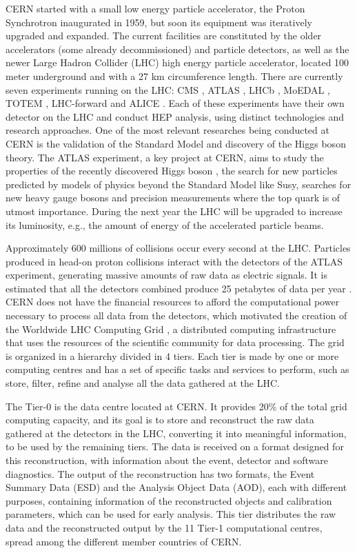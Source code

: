 CERN started with a small low energy particle accelerator, the Proton Synchrotron \cite{CERN:PS} inaugurated in 1959, but soon its equipment was iteratively upgraded and expanded. The current facilities are constituted by the older accelerators (some already decommissioned) and particle detectors, as well as the newer Large Hadron Collider (LHC) \cite{CERN:LHC} high energy particle accelerator, located 100 meter underground and with a 27 km circumference length. There are currently seven experiments running on the LHC: CMS \cite{CERN:CMS}, ATLAS \cite{CERN:ATLAS}, LHCb \cite{CERN:LHCb}, MoEDAL \cite{CERN:MoEDAL}, TOTEM \cite{CERN:TOTEM}, LHC-forward \cite{CERN:LHCf} and ALICE \cite{CERN:ALICE}. Each of these experiments have their own detector on the LHC and conduct HEP analysis, using distinct technologies and research approaches. One of the most relevant researches being conducted at CERN is the validation of the Standard Model and discovery of the Higgs boson theory. The ATLAS experiment, a key project at CERN, aims to study the properties of the recently discovered Higgs boson \cite{Higgs}, the search for new particles predicted by models of physics beyond the Standard Model like Susy, searches for new heavy gauge bosons and precision measurements where the top quark is of utmost importance. During the next year the LHC will be upgraded to increase its luminosity, e.g., the amount of energy of the accelerated particle beams.

Approximately 600 millions of collisions occur every second at the LHC. Particles produced in head-on proton collisions interact with the detectors of the ATLAS experiment, generating massive amounts of raw data as electric signals. It is estimated that all the detectors combined produce 25 petabytes of data per year \cite{CERN:DATA1,CERN:DATA2}. CERN does not have the financial resources to afford the computational power necessary to process all data from the detectors, which motivated the creation of the Worldwide LHC Computing Grid \cite{CERN:WLHCCG}, a distributed computing infrastructure that uses the resources of the scientific community for data processing. The grid is organized in a hierarchy divided in 4 tiers. Each tier is made by one or more computing centres and has a set of specific tasks and services to perform, such as store, filter, refine and analyse all the data gathered at the LHC.

The Tier-0 is the data centre located at CERN. It provides 20\% of the total grid computing capacity, and its goal is to store and reconstruct the raw data gathered at the detectors in the LHC, converting it into meaningful information, to be used by the remaining tiers. The data is received on a format designed for this reconstruction, with information about the event, detector and software diagnostics. The output of the reconstruction has two formats, the Event Summary Data (ESD) and the Analysis Object Data (AOD), each with different purposes, containing information of the reconstructed objects and calibration parameters, which can be used for early analysis. This tier distributes the raw data and the reconstructed output by the 11 Tier-1 computational centres, spread among the different member countries of CERN.

